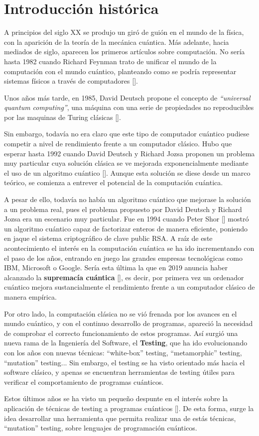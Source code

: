 \chapter{Introducción histórica}
A principios del siglo XX se produjo un giró de guión en el mundo de la física, con la aparición de la teoría de la mecánica cuántica. Más adelante, hacia mediados de siglo, aparecen los primeros artículos sobre computación. No sería hasta 1982 cuando Richard Feynman trato de unificar el mundo de la computación con el mundo cuántico, planteando como se podría 
representar sistemas físicos a través de computadores [\cite{feynman1982simulating}].

Unos años más tarde, en 1985, David Deutsch propone el concepto de \textit{``universal quantum computing''}, una máquina con una serie de propiedades no reproducibles por las maquinas de Turing clásicas [\cite{deutsch1985quantum}].

Sin embargo, todavía no era claro que este tipo de computador cuántico pudiese competir a nivel de rendimiento frente a un computador clásico. Hubo que esperar hasta 1992 cuando David Deutsch y Richard Jozsa proponen un problema muy particular cuya solución clásica se ve mejorada exponencialmente mediante el uso de un algoritmo cuántico [\cite{deutsch1992rapid}]. Aunque esta solución se
diese desde un marco teórico, se comienza a entrever el potencial de la computación cuántica.

A pesar de ello, todavía no había un algoritmo cuántico que mejorase la solución a un problema real, pues el problema propuesto por David Deutsch y Richard Jozsa era un escenario muy particular.
Fue en 1994 cuando Peter Shor [\cite{shor1994algorithms}] mostró un algoritmo cuántico capaz de factorizar enteros de manera eficiente, poniendo en jaque el sistema criptográfico de clave public RSA.  
A raíz de este acontecimiento el interés en la computación cuántica se ha ido incrementando con el paso de los años, entrando en juego las grandes empresas tecnológicas como IBM, Microsoft o Google.
Sería esta última la que en 2019 anuncia haber alcanzado la \textbf{supremacía cuántica} [\cite{arute2019quantum}], es decir, por primera vez un ordenador cuántico mejora sustancialmente el rendimiento frente a un computador clásico de manera empírica.

Por otro lado, la computación clásica no se vió frenada por los avances en el mundo cuántico, y con el continuo desarrollo de programas, apareció la necesidad de comprobar el correcto funcionamiento 
de estos programas. Así surgió una nueva rama de la Ingeniería del Software, el \textbf{Testing}, que ha ido evolucionando con los años con nuevas técnicas: ``white-box'' testing, ``metamorphic'' testing, ``mutation'' testing... Sin embargo, el testing se ha visto orientado más hacia el software clásico, y apenas se encuentran herramientas de testing útiles para verificar el comportamiento de programas cuánticos. 

Estos últimos años se ha visto un pequeño despunte en el interés sobre la aplicación de técnicas de testing a programas cuánticos [\cite{usaolaquantum}]. De esta forma, surge la idea desarrollar una herramienta que permita realizar una de estás técnicas, ``mutation'' testing, sobre lenguajes de programación cuánticos.

